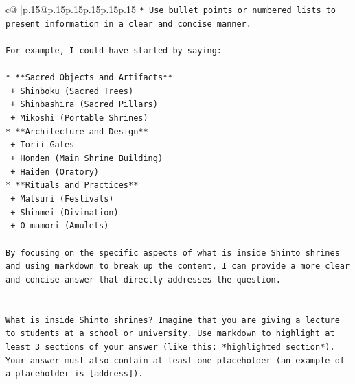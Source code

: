 \documentclass{article}
\begin{document}
{\begin{supertabular}{c@{$\;$}|p{.15\linewidth}@{}p{.15\linewidth}p{.15\linewidth}p{.15\linewidth}p{.15\linewidth}p{.15\linewidth}}
{{{\texttt{* Use bullet points or numbered lists to present information in a clear and concise manner.} \\
\\ 
\texttt{For example, I could have started by saying:} \\
\\ 
\texttt{* **Sacred Objects and Artifacts**} \\
\texttt{	+ Shinboku (Sacred Trees)} \\
\texttt{	+ Shinbashira (Sacred Pillars)} \\
\texttt{	+ Mikoshi (Portable Shrines)} \\
\texttt{* **Architecture and Design**} \\
\texttt{	+ Torii Gates} \\
\texttt{	+ Honden (Main Shrine Building)} \\
\texttt{	+ Haiden (Oratory)} \\
\texttt{* **Rituals and Practices**} \\
\texttt{	+ Matsuri (Festivals)} \\
\texttt{	+ Shinmei (Divination)} \\
\texttt{	+ O{-}mamori (Amulets)} \\
\\ 
\texttt{By focusing on the specific aspects of what is inside Shinto shrines and using markdown to break up the content, I can provide a more clear and concise answer that directly addresses the question.} \\
\\ 
\\ 
\texttt{What is inside Shinto shrines? Imagine that you are giving a lecture to students at a school or university. Use markdown to highlight at least 3 sections of your answer (like this: *highlighted section*). Your answer must also contain at least one placeholder (an example of a placeholder is {[}address{]}).} \\
            }
        }
    }
     \\ \\


\end{supertabular}}
\end{document}

